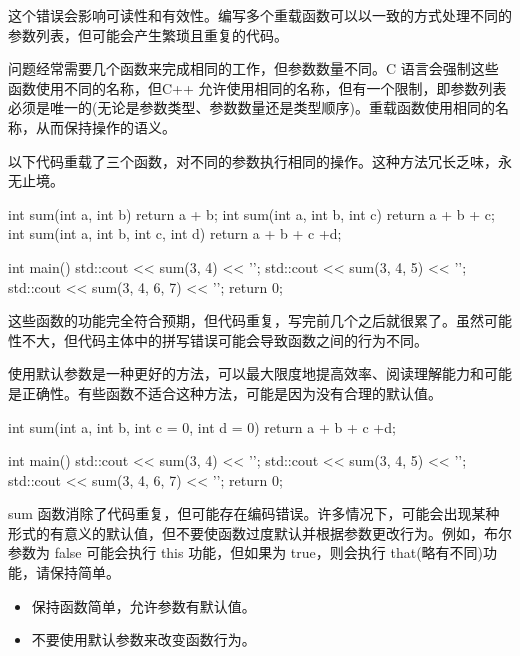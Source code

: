 这个错误会影响可读性和有效性。编写多个重载函数可以以一致的方式处理不同的参数列表，但可能会产生繁琐且重复的代码。


问题经常需要几个函数来完成相同的工作，但参数数量不同。C 语言会强制这些函数使用不同的名称，但C++ 允许使用相同的名称，但有一个限制，即参数列表必须是唯一的(无论是参数类型、参数数量还是类型顺序)。重载函数使用相同的名称，从而保持操作的语义。

以下代码重载了三个函数，对不同的参数执行相同的操作。这种方法冗长乏味，永无止境。


\begin{cpp}
int sum(int a, int b) { return a + b; }
int sum(int a, int b, int c) { return a + b + c; }
int sum(int a, int b, int c, int d) { return a + b + c +d; }

int main() {
  std::cout << sum(3, 4) << '\n';
  std::cout << sum(3, 4, 5) << '\n';
  std::cout << sum(3, 4, 6, 7) << '\n';
  return 0;
}
\end{cpp}


这些函数的功能完全符合预期，但代码重复，写完前几个之后就很累了。虽然可能性不大，但代码主体中的拼写错误可能会导致函数之间的行为不同。


使用默认参数是一种更好的方法，可以最大限度地提高效率、阅读理解能力和可能是正确性。有些函数不适合这种方法，可能是因为没有合理的默认值。


\begin{cpp}
int sum(int a, int b, int c = 0, int d = 0) { return a + b + c +d; }

int main() {
  std::cout << sum(3, 4) << '\n';
  std::cout << sum(3, 4, 5) << '\n';
  std::cout << sum(3, 4, 6, 7) << '\n';
  return 0;
}
\end{cpp}

sum 函数消除了代码重复，但可能存在编码错误。许多情况下，可能会出现某种形式的有意义的默认值，但不要使函数过度默认并根据参数更改行为。例如，布尔参数为 false 可能会执行 this 功能，但如果为 true，则会执行 that(略有不同)功能，请保持简单。


\begin{itemize}
\item
保持函数简单，允许参数有默认值。

\item
不要使用默认参数来改变函数行为。
\end{itemize}






